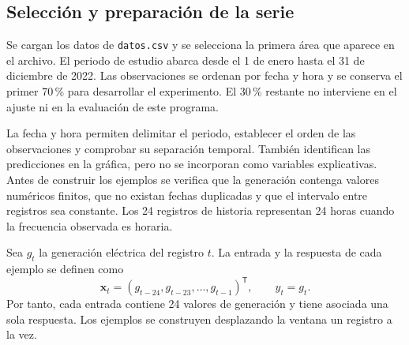 \subsection{Selección y preparación de la serie}

Se cargan los datos de \texttt{datos.csv} y se selecciona la primera área que aparece en el archivo. El periodo de estudio abarca desde el 1 de enero hasta el 31 de diciembre de 2022. Las observaciones se ordenan por fecha y hora y se conserva el primer 70\,\% para desarrollar el experimento. El 30\,\% restante no interviene en el ajuste ni en la evaluación de este programa.

La fecha y hora permiten delimitar el periodo, establecer el orden de las observaciones y comprobar su separación temporal. También identifican las predicciones en la gráfica, pero no se incorporan como variables explicativas. Antes de construir los ejemplos se verifica que la generación contenga valores numéricos finitos, que no existan fechas duplicadas y que el intervalo entre registros sea constante. Los 24 registros de historia representan 24 horas cuando la frecuencia observada es horaria.

Sea $g_t$ la generación eléctrica del registro $t$. La entrada y la respuesta de cada ejemplo se definen como
\begin{equation}
\boldsymbol{x}_t=(g_{t-24},g_{t-23},\ldots,g_{t-1})^{\mathsf T},
\qquad y_t=g_t.
\end{equation}
Por tanto, cada entrada contiene 24 valores de generación y tiene asociada una sola respuesta. Los ejemplos se construyen desplazando la ventana un registro a la vez.
